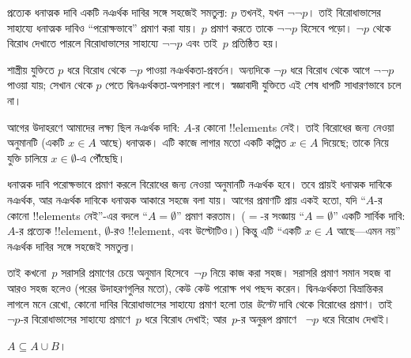 \documentclass[../../../include/open-logic-section]{subfiles}
\begin{document}
প্রত্যেক ধনাত্মক দাবি একটি নঞর্থক দাবির সঙ্গে
সহজেই সমতুল্য: $p$ তখনই, যখন $\lnot\lnot p$।
তাই বিরোধাভাসের সাহায্যে ধনাত্মক দাবিও
``পরোক্ষভাবে'' প্রমাণ করা যায়। $p$ প্রমাণ করতে
তাকে $\lnot\lnot p$ হিসেবে পড়ো। $\lnot p$
থেকে বিরোধ দেখাতে পারলে বিরোধাভাসের সাহায্যে
$\lnot\lnot p$ এবং তাই~$p$ প্রতিষ্ঠিত হয়।

\par\smallskip\noindent শাস্ত্রীয় যুক্তিতে $p$ ধরে বিরোধ থেকে $\lnot p$ পাওয়া নঞর্থকতা-প্রবর্তন। অন্যদিকে $\lnot p$ ধরে বিরোধ থেকে আগে $\lnot\lnot p$ পাওয়া যায়; সেখান থেকে $p$ পেতে দ্বিনঞর্থকতা-অপসারণ লাগে। স্বজ্ঞাবাদী যুক্তিতে এই শেষ ধাপটি সাধারণভাবে চলে না।

আগের উদাহরণে আমাদের লক্ষ্য ছিল নঞর্থক দাবি:
$A$-র কোনো !!{element}s নেই। তাই বিরোধের
জন্য নেওয়া অনুমানটি (একটি $x \in A$ আছে)
ধনাত্মক। এটি কাজে লাগার মতো একটি কল্পিত
$x \in A$ দিয়েছে; তাকে নিয়ে যুক্তি চালিয়ে
$x \in \emptyset$-এ পৌঁছেছি।

ধনাত্মক দাবি পরোক্ষভাবে প্রমাণ করলে বিরোধের জন্য
নেওয়া অনুমানটি নঞর্থক হবে। তবে প্রায়ই ধনাত্মক
দাবিকে নঞর্থক, আর নঞর্থক দাবিকে ধনাত্মক আকারে
সহজে বলা যায়। আগের প্রমাণটি প্রায় একই হতো,
যদি ``$A$-র কোনো !!{element}s নেই''-এর বদলে
``$A = \emptyset$'' প্রমাণ করতাম। ($=$-র সংজ্ঞায়
``$A = \emptyset$'' একটি সার্বিক দাবি: $A$-র
প্রত্যেক !!{element}, $\emptyset$-রও
!!{element}, এবং উল্টোটিও।) কিন্তু এটি
``একটি $x \in A$ আছে—এমন নয়'' নঞর্থক
দাবির সঙ্গে সহজেই সমতুল্য।

তাই কখনো~$p$ সরাসরি প্রমাণের চেয়ে অনুমান
হিসেবে~$\lnot p$ নিয়ে কাজ করা সহজ। সরাসরি
প্রমাণ সমান সহজ বা আরও সহজ হলেও (পরের
উদাহরণগুলির মতো), কেউ কেউ পরোক্ষ পথ পছন্দ করেন।
দ্বিনঞর্থকতা বিভ্রান্তিকর লাগলে মনে রেখো,
কোনো দাবির বিরোধাভাসের সাহায্যে প্রমাণ হলো তার
\emph{উল্টো} দাবি থেকে বিরোধের প্রমাণ। তাই
$\lnot p$-র বিরোধাভাসের সাহায্যে প্রমাণে~$p$
ধরে বিরোধ দেখাই; আর~$p$-র অনুরূপ প্রমাণে
~$\lnot p$ ধরে বিরোধ দেখাই।

\begin{prop}
$A \subseteq A \cup B$।
\end{prop}
\end{document}
